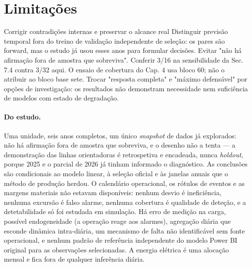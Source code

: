\section{Limitações}
\label{sec:limitacoes}
{Corrigir contradições internas e preservar o alcance real}
{Distinguir previsão temporal fora do treino de validação independente
de seleção: os pares são forward, mas o estudo já usou esses anos para
formular decisões. Evitar "não há afirmação fora de amostra que
sobreviva". Conferir 3/16 na sensibilidade da Sec. 7.4 contra 3/32 aqui.
O ensaio de cobertura do Cap. 4 usa bloco 60; não o atribuir ao bloco
base sete. Trocar "resposta completa" e "máximo defensável" por opções
de investigação: os resultados não demonstram necessidade nem suficiência
de modelos com estado de degradação.}%

\paragraph{Do estudo.} Uma unidade, seis anos completos, um único
\emph{snapshot} de dados já explorados: não há afirmação fora de amostra que
sobreviva, e o desenho não a tenta --- a demonstração das linhas
orientadoras é retrospetiva e encadeada, nunca \emph{holdout}, porque 2025 e
o parcial de 2026 já tinham informado o diagnóstico. As conclusões são
condicionais ao modelo linear, à seleção oficial e às janelas anuais que o
método de produção herdou. O calendário operacional, os rótulos de eventos e
as margens materiais não estavam disponíveis: nenhum desvio é ineficiência,
nenhuma excursão é falso alarme, nenhuma cobertura é qualidade de deteção,
e a detetabilidade só foi estudada em simulação. Há erro de medição na
carga, possível endogeneidade (a operação reage aos alarmes), agregação
diária que esconde dinâmica intra-diária, um mecanismo de falta não
identificável sem fonte operacional, e nenhum padrão de referência
independente do modelo Power BI original para as observações selecionadas.
A energia elétrica é uma alocação mensal e fica fora de qualquer inferência
diária.

